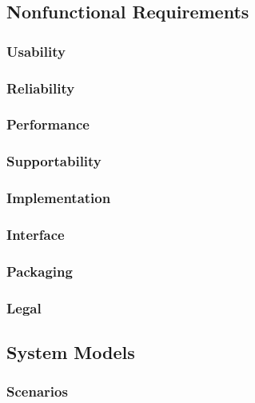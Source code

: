 \documentclass[11pt]{article}
\begin{document}
	\subsection{Nonfunctional Requirements}

		\subsubsection{Usability}

		\subsubsection{Reliability}

		\subsubsection{Performance}

		\subsubsection{Supportability}

		\subsubsection{Implementation}

		\subsubsection{Interface}

		\subsubsection{Packaging}

		\subsubsection{Legal}
	
	\subsection{System Models}

		\subsubsection{Scenarios}
\end{document}
